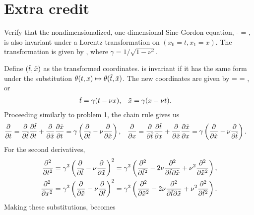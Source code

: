 \newcommand{\gam}{\gamma}
\newcommand{\xo}{x_0}
\newcommand{\xq}{x_1}
\newcommand{\tlt}{\tilde{t}}

\section{Extra credit}
\begin{problem}
	Verify that the nondimensionalized, one-dimensional Sine-Gordon equation,
	\beqn \label{sg}
		\thtxx - \thttt = \sint,
	\eeqn
	is also invariant under a Lorentz transformation on $(\xo = t, \xq = x)$.  The transformation is given by
	\beq
		\mqty[	\gam & -\gam \nu \\
				-\gam \nu & \gam ],
	\eeq
	where $\gam = 1 / \sqrt{1 - \nu^2}$.
\end{problem}

\begin{solution}
	Define $(\tlt, \xt)$ as the transformed coordinates.   is invariant if it has the same form under the substitution $\tht(t, x) \mapsto \tht(\tlt, \xt)$.  The new coordinates are given by
	\beq
		\mqty[	\tlt \\ \xt ]
		= \mqty[	\gam & -\gam \nu \\
				-\gam \nu & \gam ]
		\mqty[	t \\ x ]
		= \mqty[	\gam (t - \nu x) \\
					\gam (x - \nu t) ],
	\eeq
	or
	\begin{align*}
		\tlt &= \gam (t - \nu x), &
		\xt &= \gam (x - \nu t).
	\end{align*}
	Proceeding similarly to problem 1, the chain rule gives us
	\begin{align*}
		\pdv{}{t} &= \pdv{}{\tlt} \pdv{\tlt}{t} + \pdv{}{\xt} \pdv{\xt}{t}
		= \gam \left( \pdv{}{\tlt} - \nu \pdv{}{\xt} \right), &
		\pdv{}{x} &= \pdv{}{\tlt} \pdv{\tlt}{x} + \pdv{}{\xt} \pdv{\xt}{x}
		= \gam \left( \pdv{}{\xt} - \nu \pdv{}{\tlt} \right).
	\end{align*}
	For the second derivatives,
	\begin{align*}
		\pdv[2]{}{t} &= \gam^2 \left( \pdv{}{\tlt} - \nu \pdv{}{\xt} \right)^2
		= \gam^2 \left( \pdv[2]{}{\tlt} - 2 \nu \pdv{}{\tlt}{\xt} + \nu^2 \pdv[2]{}{\xt} \right), \\
		\pdv[2]{}{x} &= \gam^2 \left( \pdv{}{\xt} - \nu \pdv{}{\tlt} \right)^2
		= \gam^2 \left( \pdv[2]{}{\xt} - 2 \nu \pdv{}{\tlt}{\xt} + \nu^2 \pdv[2]{}{\tlt} \right).
	\end{align*}
	Making these substitutions,  becomes
	\begin{align*}

\end{align*}
\end{solution}
